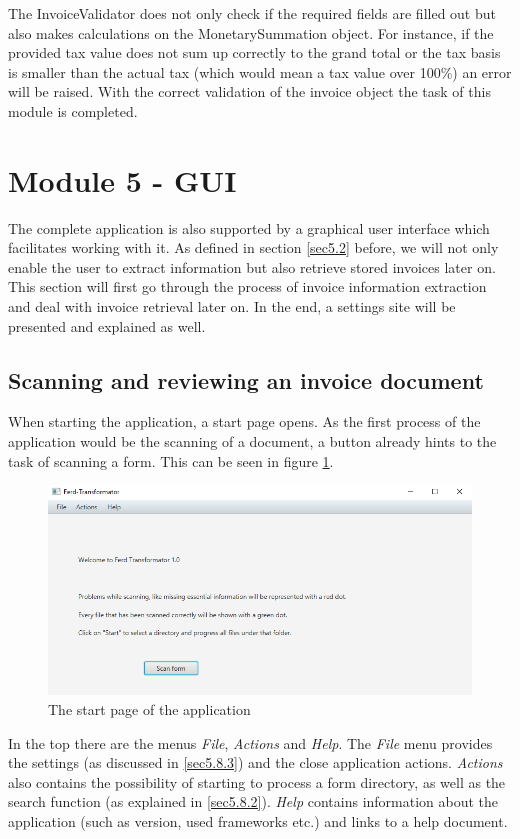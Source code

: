The InvoiceValidator does not only check if the required fields are filled out but also makes calculations on the MonetarySummation object. For instance, if the provided tax value does not sum up correctly to the grand total or the tax basis is smaller than the actual tax (which would mean a tax value over 100\%) an error will be raised.
With the correct validation of the invoice object the task of this module is completed. 

\section{Module 5 - GUI}
\label{sec5.8}
The complete application is also supported by a graphical user interface which facilitates working with it.
As defined in section \ref{sec5.2} before, we will not only enable the user to extract information but also retrieve stored invoices later on. This section will first go through the process of invoice information extraction and deal with invoice retrieval later on. In the end, a settings site will be presented and explained as well.

\subsection{Scanning and reviewing an invoice document}
\label{sec5.8.1}

When starting the application, a start page opens. As the first process of the application would be the scanning of a document, a button already hints to the task of scanning a form. This can be seen in figure \ref{startmenu}.
\begin{figure}[ht!]
\centering
\includegraphics[scale=0.6]{Images/GUI/startmenu.png}
\caption{The start page of the application \label{startmenu}}
\end{figure}

In the top there are the menus \emph{File}, \emph{Actions} and \emph{Help}. The \emph{File} menu provides the settings (as discussed in \ref{sec5.8.3}) and the close application actions.
\emph{Actions} also contains the possibility of starting to process a form directory, as well as the search function (as explained in \ref{sec5.8.2}).
\emph{Help} contains information about the application (such as version, used frameworks etc.) and links to a help document.

